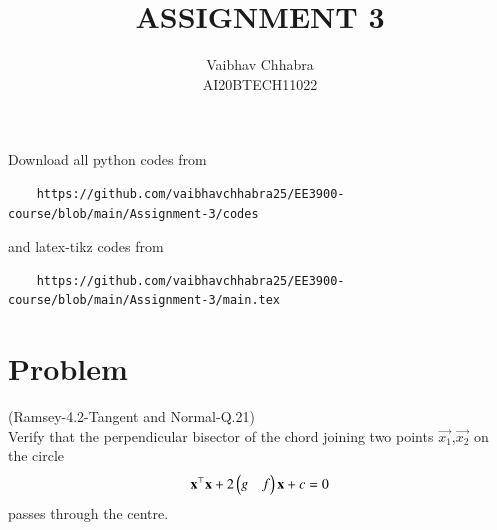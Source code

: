 \documentclass[journal,12pt,twocolumn]{IEEEtran}
\begin{document}
     \def\topbox#1{\raisebox{-\baselineskip}[0in][0in]{#1}}
     \def\midbox#1{\raisebox{-0.5\baselineskip}[0in][0in]{#1}}
\vspace{3cm}
\title{ASSIGNMENT 3}
\author{Vaibhav Chhabra\\ AI20BTECH11022}
\maketitle
\newpage
\bigskip
\renewcommand{\thefigure}{\theenumi}
\renewcommand{\thetable}{\theenumi}
Download all python codes from 
\begin{lstlisting}
    https://github.com/vaibhavchhabra25/EE3900-course/blob/main/Assignment-3/codes
\end{lstlisting}
%
and latex-tikz codes from 
%
\begin{lstlisting}
    https://github.com/vaibhavchhabra25/EE3900-course/blob/main/Assignment-3/main.tex
\end{lstlisting}
%
\section{Problem}
(Ramsey-4.2-Tangent and Normal-Q.21)\\
Verify that the perpendicular bisector of the chord joining two points $\vec{x_1}$,$\vec{x_2}$ on the circle
\begin{align}
    \mathbf{x}^\top\mathbf{x}+2\begin{pmatrix}g&f\end{pmatrix}\mathbf{x}+c=0
\end{align}
passes through the centre.
\end{document}
